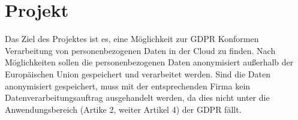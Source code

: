 \section{Projekt}
Das Ziel des Projektes ist es, eine Möglichkeit zur GDPR Konformen Verarbeitung von personenbezogenen Daten in der Cloud zu finden. Nach Möglichkeiten sollen die personenbezogenen Daten anonymisiert außerhalb der Europäischen Union gespeichert und verarbeitet werden.  Sind die Daten anonymisiert gespeichert, muss mit der entsprechenden Firma kein Datenverarbeitungsauftrag ausgehandelt werden, da dies nicht unter die Anwendungsbereich (Artike 2, weiter Artikel 4) der GDPR fällt.

